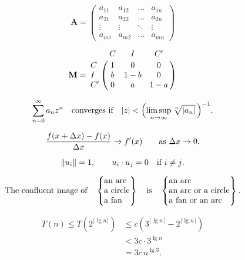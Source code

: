 \documentclass[12pt, a4paper, oneside]{article}
\newcommand{\mathup}[1]{\mathrm{#1}}
\theoremstyle{Plain}
\theoremstyle{Definition}
\theoremstyle{Remark}
\begin{document}
\begin{appendix}
$$\mathbf{A} = \begin{pmatrix}a_{11}&a_{12}&\ldots&a_{1n}\\
a_{21}&a_{22}&\ldots&a_{2n}\\
\vdots&\vdots&\ddots&\vdots\\
a_{m1}&a_{m2}&\ldots&a_{mn}\end{pmatrix}$$

$$\mathbf{M}=\bordermatrix{&C&I&C'\cr
	C&1&0&0\cr I&b&1-b&0\cr C'&0&a&1-a}$$


$$\sum_{n=0}^\infty a_nz^n\quad\hbox{converges if}\quad
|z|<\Bigl(\limsup_{n\to\infty}\root n\of{|a_n|}\,\Bigr)^{-1}.$$

$$\frac{f(x+\mathup{\Delta} x)-f(x)}{\mathup{\Delta} x}\to f'(x)
\qquad \hbox{as $\mathup{\Delta} x\to0$.}$$

$$\|u_i\|=1,\qquad u_i\cdot u_j=0\quad\hbox{if $i\ne j$.}$$


$$\hbox{The confluent image of}\quad
\begin{Bmatrix}\hbox{an arc}\hfill\\\hbox{a circle}\hfill\\
\hbox{a fan}\hfill\\\end{Bmatrix}
\quad\hbox{is}\quad
\begin{Bmatrix}\hbox{an arc}\hfill\\
\hbox{an arc or a circle}\hfill\\
\hbox{a fan or an arc}\hfill\end{Bmatrix}.$$


\begin{align*}
T(n)\le T(2^{\lceil\lg n\rceil})
&\le c(3^{\lceil\lg n\rceil}-2^{\lceil\lg n\rceil})\\
&<3c\cdot3^{\lg n}\\
&=3c\,n^{\lg3}.
\end{align*}



\end{appendix}
\end{document}
